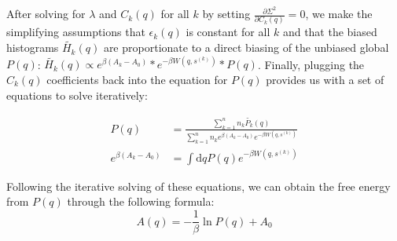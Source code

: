 \documentclass{article}
\begin{document}

After solving for $\lambda$ and $C_k(q)$ for all $k$ by setting $\frac{\partial \Sigma^2}{\partial C_k(q)} = 0$, we make the simplifying assumptions that $\epsilon_k(q)$ is constant for all $k$ and that the biased histograms $\tilde{H_k}(q)$ are proportionate to a direct biasing of the unbiased global $P(q)$: $\tilde{H_k}(q) \propto e^{\beta (A_k - A_0)} * e^{-\beta W(q, s^{(k)})} * P(q)$.
Finally, plugging the $C_k(q)$ coefficients back into the equation for $P(q)$ provides us with a set of equations to solve iteratively:

\begin{align*}
    P(q) &= \frac{\sum_{k=1}^n n_k \tilde{P_k}(q)}{\sum_{k=1}^n n_k e^{\beta (A_k - A_0)} e^{-\beta W(q, s^{(k)})}}\\
    e^{\beta (A_k - A_0)} &= \int \text{d}q P(q) e^{-\beta W(q, s^{(k)})}
\end{align*}

Following the iterative solving of these equations, we can obtain the free energy from $P(q)$ through the following formula:
$$ A(q) = -\frac{1}{\beta} \ln P(q) + A_0 $$
\end{document}
